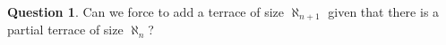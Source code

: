 \documentclass[11pt]{amsart}
\theoremstyle{definition}
\newtheorem{question}{Question}
\theoremstyle{remark}
\newcommand{\To}{\longrightarrow}
\newcommand{\g}{\textup{\textbf{g}}}
\begin{document}
%

\begin{question} Can we force to add a terrace of size $\aleph_{n+1}$ given that there is a partial terrace of size $\aleph_n$? \end{question}




%
\end{document}
